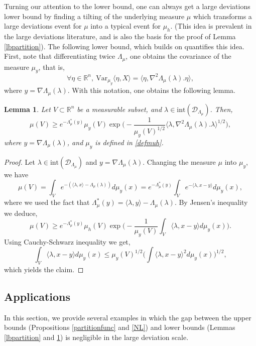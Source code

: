 \documentclass[aop,preprint]{imsart}
\newcommand\RR{\mathbb{R}}
\newcommand\Var{\mathrm{Var}}
\numberwithin{equation}{section}
\theoremstyle{definition}
\theoremstyle{plain}
\newtheorem{Lem}[Def]{Lemma}
\theoremstyle{remark}
\begin{document}
Turning our attention to the lower bound, one can always get a large deviations lower bound by finding a tilting of the underlying measure $\mu$ which transforms a large deviations event for $\mu$ into a typical event for $\mu_h$. (This idea is prevalent in the large deviations literature, and is also the basis for the proof of Lemma \ref{lbpartition}). The following lower bound, which builds on  \cite[p. 64]{Ledouxflour} quantifies this idea. First, note that differentiating twice $\Lambda_\mu$, one obtains the covariance of the measure $\mu_y$, that is,
$$\forall \eta \in \RR^n, \  \Var_{\mu_y} \langle \eta, X \rangle =\langle \eta,  \nabla^2 \Lambda_\mu(\lambda).\eta\rangle ,$$
where $y = \nabla \Lambda_\mu(\lambda)$.  With this notation, one obtains the following lemma.
\begin{Lem}\label{borneinfdet}
 Let $V \subset \RR^n$ be a measurable subset, and $\lambda \in  \mathrm{int}(\mathcal{D}_{\Lambda_{\mu}})$.  Then,
$$\mu(V) \geq e^{-\Lambda_{\mu}^*(y)} \mu_{y}(V)\exp\Big(-\frac{1}{\mu_{y}(V)^{1/2}} \langle \lambda, \nabla^2\Lambda_{\mu}(\lambda).\lambda \rangle^{1/2} \Big),$$
where $ y= \nabla \Lambda_{\mu} (\lambda) $, and $\mu_y$ is defined in \eqref{defmuh}.
\end{Lem}


\begin{proof}Let $\lambda \in \mathrm{int}(\mathcal{D}_{\Lambda_{\mu}})$ and $y = \nabla \Lambda_\mu(\lambda)$. 
Changing the measure $\mu$ into $\mu_y$, we have
$$\mu(V) = \int_{V} e^{-(\langle \lambda , x\rangle - \Lambda_\mu(\lambda))} d\mu_{y} (x) = e^{-\Lambda_{\mu}^*(y)}\int_{V} e^{-\langle \lambda ,  x-y\rangle}d\mu_{y}(x),$$
where we used the fact that $\Lambda^*_\mu(y) = \langle \lambda,y\rangle - \Lambda_\mu(\lambda)$.
By Jensen's inequality we deduce,
$$\mu(V) \geq e^{-\Lambda_{\mu}^*(y)}\mu_{h}(V) \exp\Big( -\frac{1}{\mu_{y}(V)} \int_{V} \langle \lambda , x-y \rangle d\mu_{y}(x)\Big).$$
Using Cauchy-Schwarz inequality we get,
$$ \int_{V} \langle \lambda , x-y \rangle d\mu_{y}(x) \leq \mu_{y}(V)^{1/2} \Big(\int \langle \lambda , x-y \rangle^2 d\mu_{y}(x)\Big)^{1/2},$$
which yields the claim.









\end{proof}


\subsection{Applications}
In this section, we provide several examples in which the gap between the upper bounds (Propositions \ref{partitionfunc} and \ref{NL}) and lower bounds (Lemmas \ref{lbpartition} and \ref{borneinfdet}) is negligible in the large deviation scale. 
\end{document}
